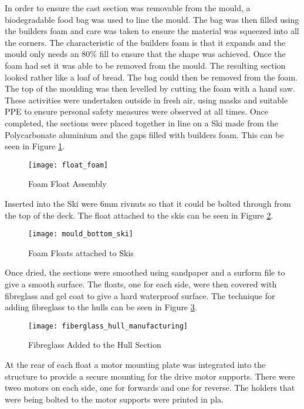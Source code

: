 \documentclass [11pt]{article}
\begin{document}
In order to ensure the cast section was removable from the mould, a biodegradable food bag was used to line the mould. The bag was then filled using the builders foam and care was taken to ensure the material was squeezed into all the corners. The characteristic of the builders foam is that it expands and the mould only needs an 80\% fill to ensure that the shape was achieved. Once the foam had set it was able to be removed from the mould. The resulting section looked rather like a loaf of bread. The bag could then be removed from the foam. The top of the moulding was then levelled by cutting the foam with a hand saw.
These activities were undertaken outside in fresh air, using masks and suitable PPE to ensure personal safety measures were observed at all times.
Once completed, the sections were placed together in line on a Ski made from the Polycarbonate aluminium and the gaps filled with builders foam. This can be seen in Figure \ref{fig:float_foam}.

\begin{figure}[H]
\centerline{\texttt{[image: float\_foam]}}
\caption{Foam Float Assembly}
\label{fig:float_foam}
\end{figure}


Inserted into the Ski were 6mm \gls{rivnut}s so that it could be bolted through from the top of the deck. The float attached to the skis can be seen in Figure \ref{fig:mould_bottom_ski}.

\begin{figure}[H]
\centerline{\texttt{[image: mould\_bottom\_ski]}}
\caption{Foam Floats attached to Skis}
\label{fig:mould_bottom_ski}
\end{figure}

Once dried, the sections were smoothed using sandpaper and a surform file to give a smooth surface. The floats, one for each side, were then covered with fibreglass and gel coat to give a hard waterproof surface. The technique for adding fibreglass to the hulls can be seen in Figure \ref{fig:fiberglass_hull_manufacturing}.

\begin{figure}[H]
\centerline{\texttt{[image: fiberglass\_hull\_manufacturing]}}
\caption{Fibreglass Added to the Hull Section}
\label{fig:fiberglass_hull_manufacturing}
\end{figure}

At the rear of each float a motor mounting plate was integrated into the structure to provide a secure mounting for the drive motor supports. There were tweo motors on each side, one for forwards and one for reverse. The holders that were being bolted to the motor supports were printed in \gls{pla}. 
\end{document}
